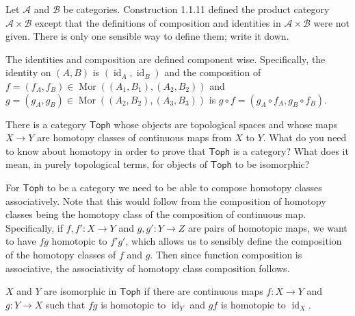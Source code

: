 \documentclass[12 pt, letterpaper]{hmcpset}
\begin{document}
\pagebreak

\begin{problem}[1.1.14]
	Let $\mathscr{A}$ and  $\mathscr{B}$ be categories. Construction 1.1.11 defined the product category  $\mathscr{A} \times \mathscr{B}$ except that the definitions of composition and identities in $\mathscr{A} \times \mathscr{B}$ were not given. There is only one sensible way to define them; write it down.
\end{problem}

\begin{solution}
	The identities and composition are defined component wise. Specifically, the identity on $(A, B)$ is $(\operatorname{id}_{A}, \operatorname{id}_{B})$ and the composition of $f = (f_{A}, f_{B}) \in \operatorname{Mor}((A_{1}, B_{1}), (A_{2}, B_{2}))$ and $g = (g_{A}, g_{B}) \in \operatorname{Mor}((A_{2}, B_{2}), (A_{3}, B_{3}))$ is $g \circ f = (g_{A} \circ f_{A}, g_{B} \circ f_{B})$.
\end{solution}

\pagebreak

\begin{problem}[1.1.15]
	There is a category $\mathsf{Toph}$ whose objects are topological spaces and whose maps $X \to Y$ are homotopy classes of continuous maps from $X$ to $Y$. What do you need to know about homotopy in order to prove that $\mathsf{Toph}$ is a category? What does it mean, in purely topological terms, for objects of $\mathsf{Toph}$ to be isomorphic?
\end{problem}

\begin{solution}
	For $\mathsf{Toph}$ to be a category we need to be able to compose homotopy classes associatively. Note that this would follow from the composition of homotopy classes being the homotopy class of the composition of continuous map. Specifically, if $f, f' : X \to Y$ and $g, g' : Y \to Z$ are pairs of homotopic maps, we want to have $fg$ homotopic to  $f' g'$, which allows us to sensibly define the composition of the homotopy classes of $f$ and $g$. Then since function composition is associative, the associativity of homotopy class composition follows.

	 $X$ and $Y$ are isomorphic in $\mathsf{Toph}$ if there are continuous maps  $f : X \to Y$ and $g : Y \to X$ such that $fg$ is homotopic to $\operatorname{id}_{Y}$ and $gf$ is homotopic to $\operatorname{id}_{X}$.
\end{solution}
\end{document}
